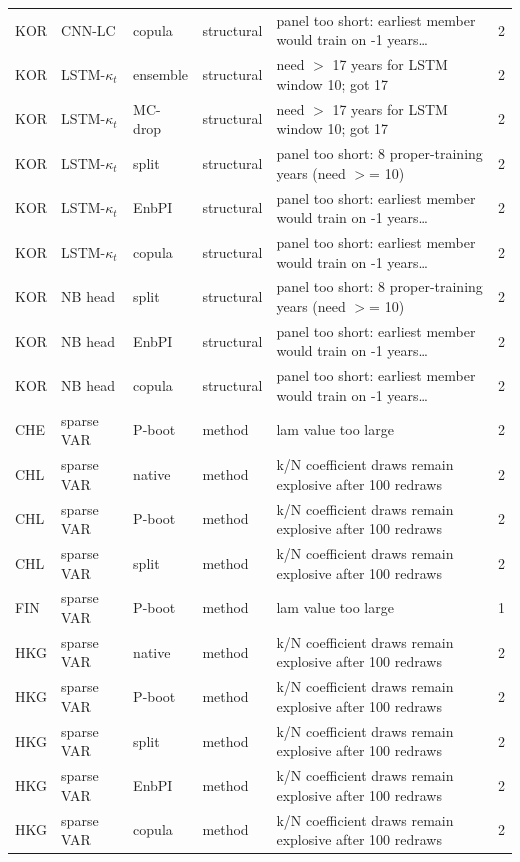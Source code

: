 {\begin{longtable}{@{}lllp{1.6cm}p{6.2cm}r@{}}
KOR & CNN-LC & copula & structural & panel too short: earliest member would train on -1 years\ldots & 2 \\
KOR & LSTM-$\kappa_t$ & ensemble & structural & need $>$ 17 years for LSTM window 10; got 17 & 2 \\
KOR & LSTM-$\kappa_t$ & MC-drop & structural & need $>$ 17 years for LSTM window 10; got 17 & 2 \\
KOR & LSTM-$\kappa_t$ & split & structural & panel too short: 8 proper-training years (need $>$= 10) & 2 \\
KOR & LSTM-$\kappa_t$ & EnbPI & structural & panel too short: earliest member would train on -1 years\ldots & 2 \\
KOR & LSTM-$\kappa_t$ & copula & structural & panel too short: earliest member would train on -1 years\ldots & 2 \\
KOR & NB head & split & structural & panel too short: 8 proper-training years (need $>$= 10) & 2 \\
KOR & NB head & EnbPI & structural & panel too short: earliest member would train on -1 years\ldots & 2 \\
KOR & NB head & copula & structural & panel too short: earliest member would train on -1 years\ldots & 2 \\
CHE & sparse VAR & P-boot & method & lam value too large & 2 \\
CHL & sparse VAR & native & method & k/N coefficient draws remain explosive after 100 redraws & 2 \\
CHL & sparse VAR & P-boot & method & k/N coefficient draws remain explosive after 100 redraws & 2 \\
CHL & sparse VAR & split & method & k/N coefficient draws remain explosive after 100 redraws & 2 \\
FIN & sparse VAR & P-boot & method & lam value too large & 1 \\
HKG & sparse VAR & native & method & k/N coefficient draws remain explosive after 100 redraws & 2 \\
HKG & sparse VAR & P-boot & method & k/N coefficient draws remain explosive after 100 redraws & 2 \\
HKG & sparse VAR & split & method & k/N coefficient draws remain explosive after 100 redraws & 2 \\
HKG & sparse VAR & EnbPI & method & k/N coefficient draws remain explosive after 100 redraws & 2 \\
HKG & sparse VAR & copula & method & k/N coefficient draws remain explosive after 100 redraws & 2 \\

\end{longtable}}
